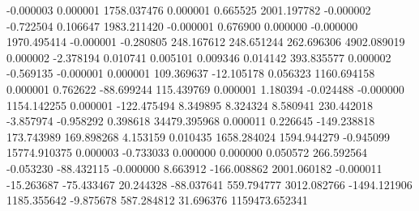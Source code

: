                                -0.000003            0.000001         1758.037476            0.000001            0.665525         2001.197782           -0.000002           -0.722504            0.106647         1983.211420           -0.000001            0.676900            0.000000           -0.000000         1970.495414           -0.000001           -0.280805          248.167612          248.651244          262.696306         4902.089019            0.000002           -2.378194            0.010741            0.005101            0.009346            0.014142          393.835577            0.000002           -0.569135           -0.000001            0.000001          109.369637          -12.105178            0.056323         1160.694158            0.000001            0.762622          -88.699244          115.439769            0.000001            1.180394           -0.024488           -0.000000         1154.142255            0.000001         -122.475494            8.349895            8.324324            8.580941          230.442018           -3.857974           -0.958292            0.398618        34479.395968            0.000011            0.226645         -149.238818          173.743989          169.898268            4.153159            0.010435         1658.284024         1594.944279           -0.945099        15774.910375            0.000003           -0.733033            0.000000            0.000000            0.050572          266.592564           -0.053230          -88.432115           -0.000000            8.663912         -166.008862         2001.060182           -0.000011          -15.263687          -75.433467           20.244328          -88.037641          559.794777         3012.082766        -1494.121906         1185.355642           -9.875678          587.284812           31.696376      1159473.652341